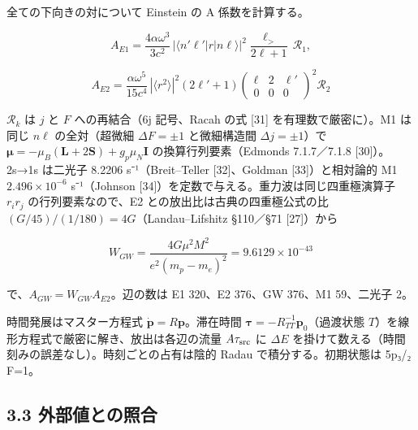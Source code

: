 \documentclass[
  a4paper,
]{ltjsarticle}
\begin{document}
全ての下向きの対について Einstein の A 係数を計算する。

\[
A_{E1}=\frac{4\alpha\omega^3}{3c^2}\,|\langle n'\ell'|r|n\ell\rangle|^2\frac{\ell_>}{2\ell+1}\,\mathcal R_1,
\]

\[
A_{E2}=\frac{\alpha\omega^5}{15c^4}\,|\langle r^2\rangle|^2(2\ell'+1)\begin{pmatrix}\ell&2&\ell'\\0&0&0\end{pmatrix}^2\mathcal R_2
\]

\(\mathcal R_k\) は \(j\) と \(F\) への再結合（6j 記号、Racah の式
{[}31{]} を有理数で厳密に）。M1 は同じ \(n\ell\) の全対（超微細
\(\Delta F=\pm1\) と微細構造間 \(\Delta j=\pm1\)）で
\(\boldsymbol\mu=-\mu_B(\mathbf L+2\mathbf S)+g_p\mu_N\mathbf I\)
の換算行列要素（Edmonds 7.1.7／7.1.8 {[}30{]}）。2s→1s は二光子 8.2206
s⁻¹（Breit--Teller {[}32{]}、Goldman {[}33{]}）と相対論的 M1
\(2.496\times10^{-6}\) s⁻¹（Johnson
{[}34{]}）を定数で与える。重力波は同じ四重極演算子 \(r_ir_j\)
の行列要素なので、E2 との放出比は古典の四重極公式の比
\((G/45)/(1/180)=4G\)（Landau--Lifshitz §110／§71 {[}27{]}）から

\[
W_{GW}=\frac{4G\mu^2M^2}{e^2(m_p-m_e)^2}=9.6129\times10^{-43}
\]

で、\(A_{GW}=W_{GW}A_{E2}\)。辺の数は E1 320、E2 376、GW 376、M1
59、二光子 2。

時間発展はマスター方程式 \(\dot{\mathbf p}=R\mathbf p\)。滞在時間
\(\boldsymbol\tau=-R_{TT}^{-1}\mathbf p_0\)（過渡状態
\(T\)）を線形方程式で厳密に解き、放出は各辺の流量 \(A\tau_{\rm src}\) に
\(\Delta E\) を掛けて数える（時間刻みの誤差なし）。時刻ごとの占有は陰的
Radau で積分する。初期状態は 5p₃/₂ F=1。

\subsection{3.3
外部値との照合}\label{ux5916ux90e8ux5024ux3068ux306eux7167ux5408}
\end{document}
